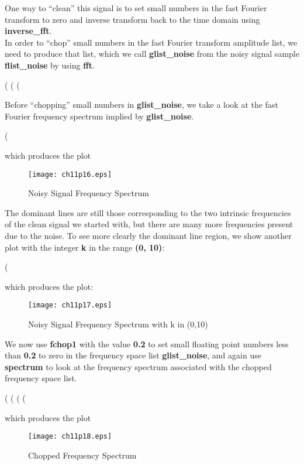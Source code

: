 \documentclass[11pt]{article}
\newcommand{\tcbr}{\textcolor{BrickRed}}
\begin{document}
\noindent One way to ``clean'' this signal is to set small numbers in the fast Fourier
  transform to zero and inverse transform back to the time domain using
  \textbf{inverse\_fft}.\\
  
\noindent In order to ``chop'' small numbers in the fast Fourier transform
  amplitude list, we need to produce that list, which we call
  \textbf{glist\_noise} from the noisy signal sample \textbf{flist\_noise} by
   using \textbf{fft}.
\begin{myVerbatim}
(%
(%
(%
\end{myVerbatim}

\noindent Before ``chopping'' small numbers in \textbf{glist\_noise}, we take a look at the
  fast Fourier frequency spectrum implied by \textbf{glist\_noise}.
\begin{myVerbatim}
(%
\end{myVerbatim} 
which produces the plot
\smallskip
\begin{figure} [h]  
   \centerline{\texttt{[image: ch11p16.eps]} }
	\caption{Noisy Signal Frequency Spectrum}
\end{figure} 

\noindent The dominant lines are still those corresponding to the two intrinsic
  frequencies of the clean signal we started with, but there are many more frequencies
  present due to the noise.
\newpage
\noindent To see more clearly the dominant line region, we show another plot with 
  the integer \textbf{k} in the range \textbf{(0, 10)}: 
\begin{myVerbatim1}
(%
\end{myVerbatim1} 
which produces the plot:
\smallskip
\begin{figure} [h]  
   \centerline{\texttt{[image: ch11p17.eps]} }
	\caption{Noisy Signal Frequency Spectrum with k in (0,10)}
\end{figure} 

\noindent We now use \textbf{fchop1} with the value \textbf{0.2} to set small floating point numbers
  less than \textbf{0.2} to \tcbr{zero} in the frequency space list \textbf{glist\_noise}, 
  and again use \textbf{spectrum} to look at the frequency spectrum associated with the
  chopped frequency space list. 
\begin{myVerbatim1}
(%
(%
(%
(%
\end{myVerbatim1} 
which produces the plot
\begin{figure} [h]  
   \centerline{\texttt{[image: ch11p18.eps]} }
	\caption{Chopped Frequency Spectrum }
\end{figure} 
\end{document}
